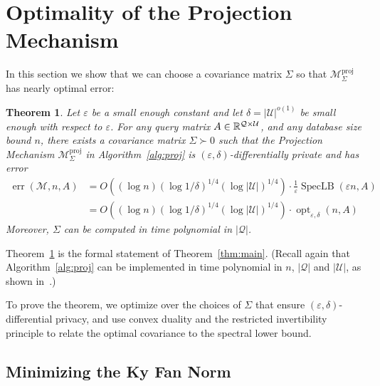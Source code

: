 \documentclass{article}
\newtheorem{theorem}{Theorem}[section]
\newcommand{\alg}{\mathcal{M}}
\newcommand{\eps}{\varepsilon}
\newcommand{\univ}{U}
\DeclareMathOperator{\specLB}{SpecLB}
\DeclareMathOperator{\err}{err}
\DeclareMathOperator{\opt}{opt}
\renewcommand{\univ}{\mathcal{U}}
\newcommand{\quer}{\mathcal{Q}}
\begin{document}
\section{Optimality of the Projection Mechanism}

In this section we show that we can choose a covariance matrix
$\Sigma$ so that $\alg_\Sigma^{\text{proj}}$ has nearly optimal
error:
\begin{theorem}\label{thm:main-smalldb}
  Let $\eps$ be a small enough constant and let $\delta =
  |\univ|^{o(1)}$ be small enough with respect to $\eps$. For any
  query matrix $A \in \R^{\quer \times \univ}$, and any database size
  bound $n$, there exists a covariance matrix $\Sigma \succ 0$ such
  that the Projection Mechanism $\alg_\Sigma^{\text{proj}}$ in
  Algorithm~\ref{alg:proj} is $(\eps, \delta)$-differentially private
  and has error
  \begin{align*}
  \err(\alg,n, A) &=
  O((\log n) (\log 1/\delta)^{1/4} (\log |\univ|)^{1/4})
  \cdot\frac{1}{\eps}\specLB(\eps n, A)\\
  &= O((\log n) (\log 1/\delta)^{1/4} (\log |\univ|)^{1/4}) \cdot\opt_{\eps, \delta}(n, A)
  \end{align*}
  Moreover, $\Sigma$ can be computed in time polynomial in $|\quer|$.
\end{theorem}

Theorem~\ref{thm:main-smalldb} is the formal statement of
Theorem~\ref{thm:main}. (Recall again that Algorithm~\ref{alg:proj}
can be implemented in time polynomial in $n$, $|\quer|$ and $|\univ|$, as shown in~\cite{NTZ,conjunctions}.)


To prove the theorem, we optimize over the choices of $\Sigma$ that
ensure $(\eps, \delta)$-differential privacy, and use convex duality
and the restricted invertibility principle to relate the optimal
covariance to the spectral lower bound.

\subsection{Minimizing the Ky Fan Norm}
\end{document}
